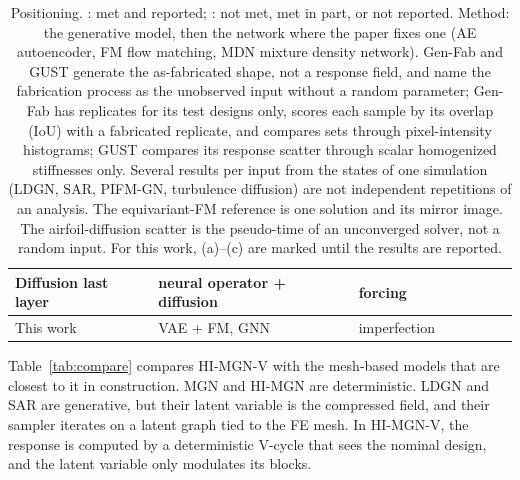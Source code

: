 \documentclass[preprint,12pt]{elsarticle}
\newcommand{\yes}{\ding{51}}
\newcommand{\no}{\ding{55}}
\begin{document}
\begin{table}[!htbp]
\begin{tabularx}{\textwidth}{@{}Y >{\raggedright\arraybackslash}p{2.5cm} >{\raggedright\arraybackslash}p{2.1cm} *{5}{>{\centering\arraybackslash}p{1.1cm}}@{}}
Diffusion last layer \cite{park2026dll} & neural operator + diffusion & forcing & \yes & \yes & \no & \yes & \no \\
\midrule
This work & VAE + FM, GNN & imperfection & \yes & \yes & \no & \no & \no \\
\bottomrule
\end{tabularx}
\caption{Positioning. \yes: met and reported; \no: not met, met in part, or not reported. Method:
the generative model, then the network where the paper fixes one (AE autoencoder, FM flow
matching, MDN mixture density network). Gen-Fab and GUST generate the as-fabricated shape, not a
response field, and name the fabrication process as the unobserved input without a random
parameter; Gen-Fab has replicates for its test designs only, scores each sample by its overlap
(IoU) with a fabricated replicate, and compares sets through pixel-intensity histograms; GUST
compares its response scatter through scalar homogenized stiffnesses only. Several results per
input from the states of one simulation (LDGN, SAR, PIFM-GN, turbulence diffusion) are not
independent repetitions of an analysis. The equivariant-FM reference is one solution and its
mirror image. The airfoil-diffusion scatter is the pseudo-time of an unconverged solver, not a
random input. For this work, (a)--(c) are marked \no{} until the results are reported.}
\label{tab:ox}
\end{table}

Table~\ref{tab:compare} compares HI-MGN-V with the mesh-based models that are closest to it in
construction. MGN and HI-MGN are deterministic. LDGN and SAR are generative, but their latent
variable is the compressed field, and their sampler iterates on a latent graph tied to the FE
mesh. In HI-MGN-V, the response is computed by a deterministic V-cycle that sees the nominal
design, and the latent variable only modulates its blocks.
\end{document}
